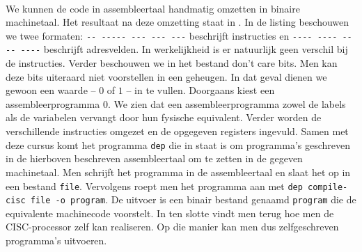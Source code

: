 \paragraph{}
We kunnen de code in assembleertaal handmatig omzetten in binaire machinetaal. Het resultaat na deze omzetting staat in . In de listing beschouwen we twee formaten: \verb+-- ----- --- --- ---+ beschrijft instructies en \verb+---- ---- ---- ----+ beschrijft adresvelden. In werkelijkheid is er natuurlijk geen verschil bij de instructies. Verder beschouwen we in het bestand don't care bits. Men kan deze bits uiteraard niet voorstellen in een geheugen. In dat geval dienen we gewoon een waarde -- $0$ of $1$ -- in te vullen. Doorgaans kiest een assembleerprogramma $0$. We zien dat een assembleerprogramma zowel de labels als de variabelen vervangt door hun fysische equivalent. Verder worden de verschillende instructies omgezet en de opgegeven registers ingevuld. Samen met deze cursus komt het programma \verb+dep+ die in staat is om programma's geschreven in de hierboven beschreven assembleertaal om te zetten in de gegeven machinetaal. Men schrijft het programma in de assembleertaal en slaat het op in een bestand \verb+file+. Vervolgens roept men het programma aan met \verb+dep compile-cisc file -o program+. De uitvoer is een binair bestand genaamd \verb+program+ die de equivalente machinecode voorstelt. In  ten slotte vindt men terug hoe men de CISC-processor zelf kan realiseren. Op die manier kan men dus zelfgeschreven programma's uitvoeren.
